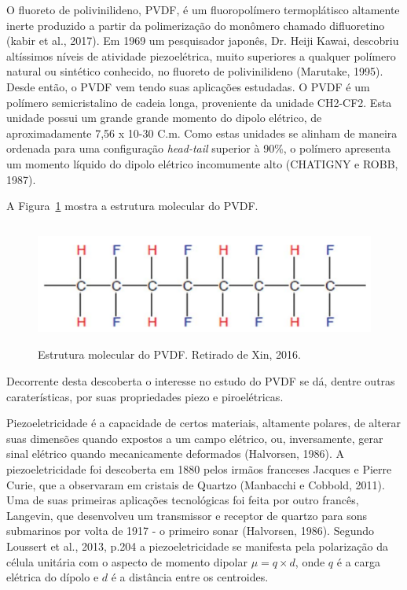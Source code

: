 \documentclass[
	12pt,				
	oneside,			
	a4paper,			
	english,			
	brazil,			
	]{abntex2ppgsi}
\begin{document}
O fluoreto de polivinilideno, PVDF, é um fluoropolímero termoplátisco altamente inerte produzido a partir da polimerização do monômero chamado difluoretino (kabir et al., 2017). Em 1969 um pesquisador japonês, Dr. Heiji Kawai, descobriu altíssimos níveis de atividade piezoelétrica, muito superiores a qualquer polímero natural ou sintético conhecido, no fluoreto de polivinilideno (Marutake, 1995). Desde então, o PVDF vem tendo suas aplicações estudadas. O PVDF é um polímero semicristalino de cadeia longa, proveniente da unidade CH2-CF2. Esta unidade possui um grande grande momento do dipolo elétrico, de aproximadamente 7,56 x 10-30 C.m. Como estas unidades se alinham de maneira ordenada para uma configuração \textit{head-tail} superior à 90\%, o polímero apresenta um momento líquido do dipolo elétrico incomumente alto (CHATIGNY e ROBB, 1987).

A Figura~\ref{pvdf_cadeia} mostra a estrutura molecular do PVDF.

\begin{figure}[H]
\centering
\includegraphics[width=\textwidth,height=40mm,keepaspectratio]{pvdf_cadeia}
\caption {Estrutura molecular do PVDF. Retirado de Xin, 2016.}
\label{pvdf_cadeia}
\end{figure}

Decorrente desta descoberta o interesse no estudo do PVDF se dá, dentre outras caraterísticas, por suas propriedades piezo e piroelétricas. 

Piezoeletricidade é a capacidade de certos materiais, altamente polares, de alterar suas dimensões quando expostos a um campo elétrico, ou, inversamente, gerar sinal elétrico quando mecanicamente deformados (Halvorsen, 1986). A piezoeletricidade foi descoberta em 1880 pelos irmãos franceses Jacques e Pierre Curie, que a observaram em cristais de Quartzo (Manbacchi e Cobbold, 2011). Uma de suas primeiras aplicações tecnológicas foi feita por outro francês, Langevin, que desenvolveu um transmissor e receptor de quartzo para sons submarinos por volta de 1917 - o primeiro sonar (Halvorsen, 1986). Segundo Loussert et al., 2013, p.204 a piezoeletricidade se manifesta pela polarização da célula unitária com o aspecto de momento dipolar $\mu = q\times d$, onde $q$ é a carga elétrica do dípolo e $d$ é a distância entre os centroides.  
\end{document}
